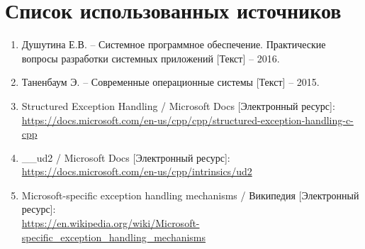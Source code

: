 \newpage

\section*{Список использованных источников}

\begin{enumerate}
	\item Душутина Е.В. -- Системное программное обеспечение. Практические вопросы разработки системных приложений [Текст] -- 2016.
	\item Таненбаум Э. -- Современные операционные системы [Текст] -- 2015.
	\item Structured Exception Handling / Microsoft Docs [Электронный ресурс]:\\
		{\small\url{https://docs.microsoft.com/en-us/cpp/cpp/structured-exception-handling-c-cpp}}
	\item \_\_ud2 / Microsoft Docs [Электронный ресурс]:\\
		{\small\url{https://docs.microsoft.com/en-us/cpp/intrinsics/ud2}}
	\item Microsoft-specific exception handling mechanisms / Википедия [Электронный ресурс]:\\
		{\small\url{https://en.wikipedia.org/wiki/Microsoft-specific_exception_handling_mechanisms}}
\end{enumerate}


